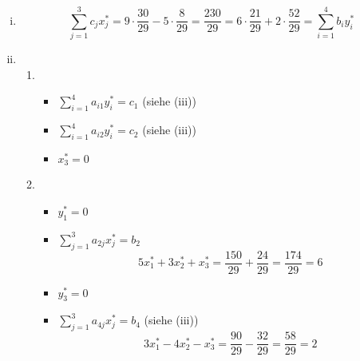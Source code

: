 \documentclass[a4paper]{scrartcl}
\begin{document}
\begin{enumerate}[label=\bfseries\arabic*.]
\begin{enumerate}
\begin{enumerate}[(i)]
                    \item
                        \begin{equation}
                            \sum_{j=1}^3 c_jx_j^* = 9 \cdot \frac{30}{29} - 5 \cdot \frac{8}{29} = \frac{230}{29} = 6 \cdot \frac{21}{29} + 2 \cdot \frac{52}{29} = \sum_{i=1}^4 b_iy_i^*
                        \end{equation}

                    \item
                        \begin{enumerate}
                            \item
                                \begin{itemize}
                                    \item $\sum_{i=1}^4 a_{i1}y_i^* = c_1$ (siehe (iii))

                                    \item $\sum_{i=1}^4 a_{i2}y_i^* = c_2$ (siehe (iii))

                                    \item $x_3^* = 0$

                                \end{itemize}

                            \item
                                \begin{itemize}
                                    \item $y_1^* = 0$

                                    \item $\sum_{j=1}^3 a_{2j}x_j^* = b_2$ \\
                                        \begin{equation}
                                            5x_1^* +3x_2^* +x_3^* = \frac{150}{29} + \frac{24}{29} = \frac{174}{29} = 6
                                        \end{equation}
                                        
                                    \item $y_3^* = 0$

                                    \item $\sum_{j=1}^3 a_{4j}x_j^* = b_4$ (siehe (iii))
                                        \begin{equation}
                                            3x_1^* -4x_2^* -x_3^* = \frac{90}{29} - \frac{32}{29} = \frac{58}{29} = 2
                                        \end{equation}
                                        

\end{itemize}
\end{enumerate}
\end{enumerate}
\end{enumerate}
\end{enumerate}
\end{document}

